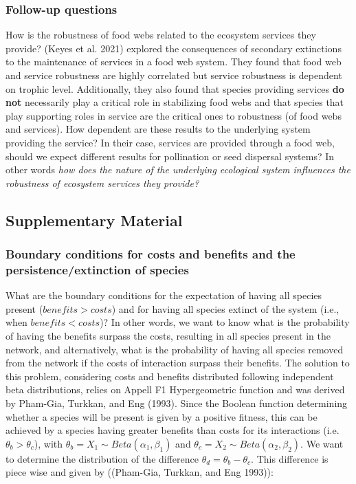 \documentclass[
  letterpaper,
  DIV=11,
  numbers=noendperiod]{scrartcl}
\begin{document}
\subsubsection{Follow-up questions}\label{follow-up-questions}

How is the robustness of food webs related to the ecosystem services
they provide? (Keyes et al. 2021) explored the consequences of secondary
extinctions to the maintenance of services in a food web system. They
found that food web and service robustness are highly correlated but
service robustness is dependent on trophic level. Additionally, they
also found that species providing services \textbf{do not} necessarily
play a critical role in stabilizing food webs and that species that play
supporting roles in service are the critical ones to robustness (of food
webs and services). How dependent are these results to the underlying
system providing the service? In their case, services are provided
through a food web, should we expect different results for pollination
or seed dispersal systems? In other words \emph{how does the nature of
the underlying ecological system influences the robustness of ecosystem
services they provide?}

\subsection{Supplementary Material}\label{supplementary-material}

\subsubsection{Boundary conditions for costs and benefits and the
persistence/extinction of
species}\label{boundary-conditions-for-costs-and-benefits-and-the-persistenceextinction-of-species}

What are the boundary conditions for the expectation of having all
species present (\(benefits > costs\)) and for having all species
extinct of the system (i.e., when \(benefits < costs\))? In other words,
we want to know what is the probability of having the benefits surpass
the costs, resulting in all species present in the network, and
alternatively, what is the probability of having all species removed
from the network if the costs of interaction surpass their benefits. The
solution to this problem, considering costs and benefits distributed
following independent beta distributions, relies on Appell F1
Hypergeometric function and was derived by Pham-Gia, Turkkan, and Eng
(1993). Since the Boolean function determining whether a species will be
present is given by a positive fitness, this can be achieved by a
species having greater benefits than costs for its interactions
(i.e.~\(\theta_b > \theta_c\)), with
\(\theta_b = X_1 \sim Beta(\alpha_1, \beta_1)\) and
\(\theta_c = X_2 \sim Beta(\alpha_2, \beta_2)\). We want to determine
the distribution of the difference \(\theta_d = \theta_b - \theta_c\).
This difference is piece wise and given by ((Pham-Gia, Turkkan, and Eng
1993)):
\end{document}
